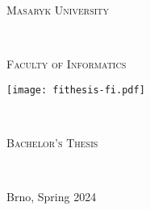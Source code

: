 \begin{titlepage}
  \vspace*{2cm}
  \makeatletter
  \begin{center}
      \begin{LARGE}
          \textsc{Masaryk University}
      \end{LARGE}\\[0.01cm]
      \begin{Large}
          \textsc{Faculty of Informatics\\}
      \end{Large}
      \vspace*{1cm}
      \texttt{[image: fithesis-fi.pdf]}\\
      \vspace*{3cm}
    \begin{Huge}
      \@title
    \end{Huge}\\[1.5cm]
    \begin{Large}
        \textsc{Bachelor's Thesis}
    \end{Large}\\[1.5cm]
    \begin{LARGE}
        \@author
    \end{LARGE}
    \vfill
  \end{center}
  \begin{flushright}
      \begin{large}
        Brno, Spring 2024
      \end{large}
  \end{flushright}
  \makeatother
\end{titlepage}

\newpage
\null
\thispagestyle{empty}
\newpage
